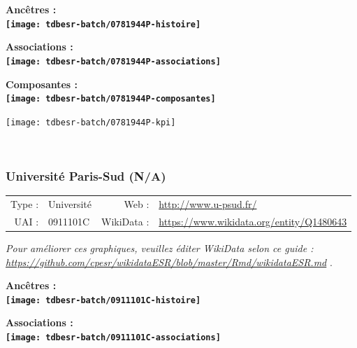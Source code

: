\documentclass[12pt,french,]{article}
\begin{document}
\vspace{1cm}  
\begin{minipage}[b]{0.50\textwidth}\begin{center} \bf Ancêtres : \\  
\texttt{[image: tdbesr-batch/0781944P-histoire]} \end{center}\end{minipage}\begin{minipage}[b]{0.50\textwidth}\begin{center} \bf Associations : \\  
\texttt{[image: tdbesr-batch/0781944P-associations]} \end{center}\end{minipage}

\hrulefill

\begin{center} \bf Composantes : \\  
\texttt{[image: tdbesr-batch/0781944P-composantes]} \end{center}

\begin{center}\texttt{[image: tdbesr-batch/0781944P-kpi]} \end{center}\checkoddpage

\ifoddpage \fi ~\newpage  

\hypertarget{universituxe9-paris-sud-na}{%
\subsubsection{Université Paris-Sud
(N/A)}\label{universituxe9-paris-sud-na}}

\begin{tabular*}{\textwidth}{rp{5cm}rl}  
\hline  
Type : & Université & Web : &\href{http://www.u-psud.fr/}{http://www.u-psud.fr/} \\  
UAI : & 0911101C & WikiData : & \href{https://www.wikidata.org/entity/Q1480643}{https://www.wikidata.org/entity/Q1480643} \\  
\hline  
\end{tabular*}

\textit{\scriptsize Pour améliorer ces graphiques, veuillez éditer WikiData selon ce guide :  \href{https://github.com/cpesr/wikidataESR/blob/master/Rmd/wikidataESR.md}{https://github.com/cpesr/wikidataESR/blob/master/Rmd/wikidataESR.md}}
.

\vspace{1cm}  
\begin{minipage}[b]{0.50\textwidth}\begin{center} \bf Ancêtres : \\  
\texttt{[image: tdbesr-batch/0911101C-histoire]} \end{center}\end{minipage}\begin{minipage}[b]{0.50\textwidth}\begin{center} \bf Associations : \\  
\texttt{[image: tdbesr-batch/0911101C-associations]} \end{center}\end{minipage}
\end{document}
